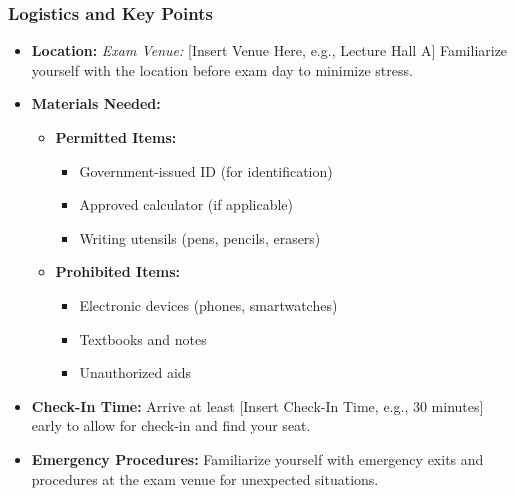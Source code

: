 \documentclass[aspectratio=169]{beamer}
\begin{document}
\begin{frame}[fragile]
    \frametitle{Logistics and Key Points}
    \begin{itemize}
        \item \textbf{Location:}  
        \newline
        \textit{Exam Venue:} [Insert Venue Here, e.g., Lecture Hall A]  
        \newline
        Familiarize yourself with the location before exam day to minimize stress.

        \item \textbf{Materials Needed:}  
        \begin{itemize}
            \item \textbf{Permitted Items:}
            \begin{itemize}
                \item Government-issued ID (for identification)
                \item Approved calculator (if applicable)
                \item Writing utensils (pens, pencils, erasers)
            \end{itemize}
            \item \textbf{Prohibited Items:}
            \begin{itemize}
                \item Electronic devices (phones, smartwatches)
                \item Textbooks and notes
                \item Unauthorized aids
            \end{itemize}
        \end{itemize}
        
        \item \textbf{Check-In Time:}  
        \newline
        Arrive at least [Insert Check-In Time, e.g., 30 minutes] early to allow for check-in and find your seat.
        
        \item \textbf{Emergency Procedures:}  
        \newline
        Familiarize yourself with emergency exits and procedures at the exam venue for unexpected situations.
    \end{itemize}
\end{frame}
\end{document}
